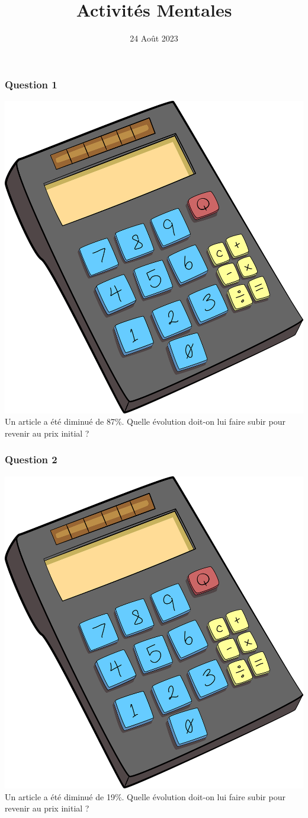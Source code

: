 \documentclass[15pt, mathserif]{beamer}
\title{Activités Mentales}
\date{24 Août 2023}
\begin{document}
\begin{frame}
    \titlepage
\end{frame}

\begin{frame} 
	\frametitle{Question 1}
 \includegraphics[scale=0.01]{calculatrice} Un article a été diminué de 87\%. Quelle évolution doit-on lui faire subir pour revenir au prix initial ? \end{frame}


\begin{frame} 
	\frametitle{Question 2}
 \includegraphics[scale=0.01]{calculatrice} Un article a été diminué de 19\%. Quelle évolution doit-on lui faire subir pour revenir au prix initial ? \end{frame}
\end{document}

